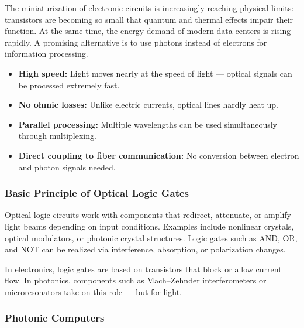 The miniaturization of electronic circuits is increasingly reaching physical limits: transistors are becoming so small that quantum and thermal effects impair their function. At the same time, the energy demand of modern data centers is rising rapidly. A promising alternative is to use photons instead of electrons for information processing.
\newpage
\noindent
\vspace{1em}
\begin{tcolorbox}[physikbox, title=Why Photons Are Attractive for Logic Circuits, label=box:optlogik_vorteile]
	\small
	\begin{itemize}
		\item \textbf{High speed:} Light moves nearly at the speed of light — optical signals can be processed extremely fast.
		\item \textbf{No ohmic losses:} Unlike electric currents, optical lines hardly heat up.
		\item \textbf{Parallel processing:} Multiple wavelengths can be used simultaneously through multiplexing.
		\item \textbf{Direct coupling to fiber communication:} No conversion between electron and photon signals needed.
	\end{itemize}
\end{tcolorbox}

\subsubsection{Basic Principle of Optical Logic Gates}

Optical logic circuits work with components that redirect, attenuate, or amplify light beams depending on input conditions. Examples include nonlinear crystals, optical modulators, or photonic crystal structures.  
Logic gates such as \textsc{AND}, \textsc{OR}, and \textsc{NOT} can be realized via interference, absorption, or polarization changes.
\vspace{1em}
\begin{tcolorbox}[didaktikbox, title=From Electronics to Photonics]
	\label{box:optlogik_didaktik}
	\small
	In electronics, logic gates are based on transistors that block or allow current flow. In photonics, components such as Mach–Zehnder interferometers or microresonators take on this role — but for light.
\end{tcolorbox}

\subsubsection{Photonic Computers}

